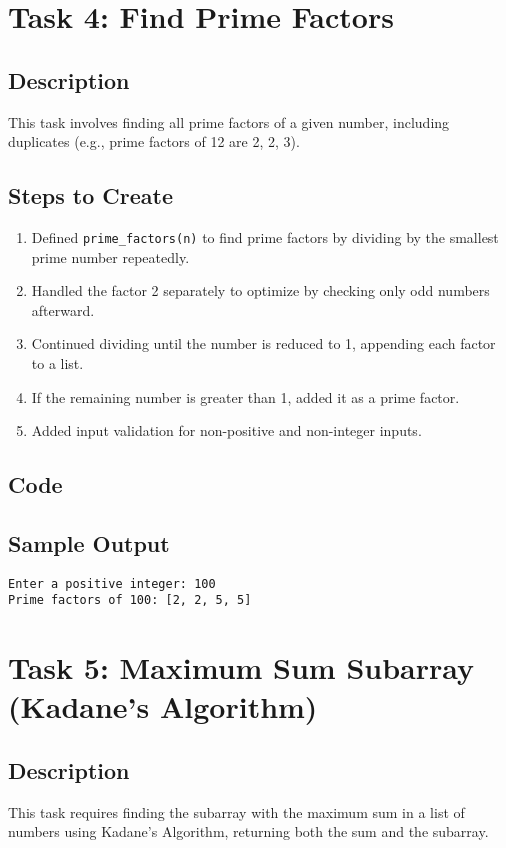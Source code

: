 \documentclass[a4paper,12pt]{article}
\begin{document}
\section{Task 4: Find Prime Factors}
\subsection{Description}
This task involves finding all prime factors of a given number, including duplicates (e.g., prime factors of 12 are 2, 2, 3).

\subsection{Steps to Create}
\begin{enumerate}
    \item Defined \texttt{prime\_factors(n)} to find prime factors by dividing by the smallest prime number repeatedly.
    \item Handled the factor 2 separately to optimize by checking only odd numbers afterward.
    \item Continued dividing until the number is reduced to 1, appending each factor to a list.
    \item If the remaining number is greater than 1, added it as a prime factor.
    \item Added input validation for non-positive and non-integer inputs.
\end{enumerate}

\subsection{Code}


\subsection{Sample Output}
\begin{verbatim}
Enter a positive integer: 100
Prime factors of 100: [2, 2, 5, 5]
\end{verbatim}

\section{Task 5: Maximum Sum Subarray (Kadane's Algorithm)}
\subsection{Description}
This task requires finding the subarray with the maximum sum in a list of numbers using Kadane's Algorithm, returning both the sum and the subarray.
\end{document}
